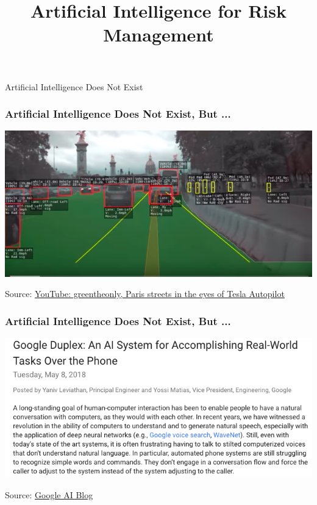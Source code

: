 %
%



\title{Artificial Intelligence for Risk Management}

\maketitle

\begin{frame}[c]
\begin{center}
\huge Artificial Intelligence Does Not Exist
\end{center}
\end{frame}

\begin{frame}
\frametitle{Artificial Intelligence Does Not Exist, But ...}
\includegraphics[width=\textwidth]{figures/tesla_paris}

Source: \href{https://www.youtube.com/watch?v=_1MHGUC_BzQs}{YouTube: greentheonly, Paris streets in the eyes of Tesla Autopilot}
\end{frame}

\begin{frame}
\frametitle{Artificial Intelligence Does Not Exist, But ...}
\includegraphics[width=\textwidth]{figures/google_duplex}

Source: \href{https://ai.googleblog.com/2018/05/duplex-ai-system-for-natural-conversation.html}{Google AI Blog}
\end{frame}

